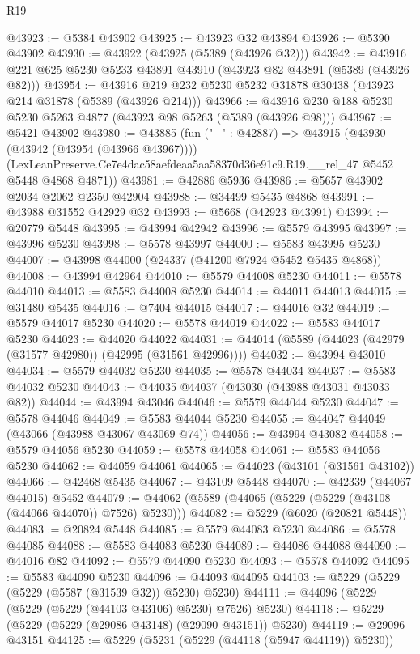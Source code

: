 \begin{lexlean}{R19}
\begin{coremodule}
@43923 := @5384 @43902
@43925 := @43923 @32 @43894
@43926 := @5390 @43902
@43930 := @43922 (@43925 (@5389 (@43926 @32)))
@43942 := @43916 @221 @625 @5230 @5233 @43891 @43910 (@43923 @82 @43891 (@5389 (@43926 @82)))
@43954 := @43916 @219 @232 @5230 @5232 @31878 @30438 (@43923 @214 @31878 (@5389 (@43926 @214)))
@43966 := @43916 @230 @188 @5230 @5230 @5263 @4877 (@43923 @98 @5263 (@5389 (@43926 @98)))
@43967 := @5421 @43902
@43980 := @43885
    (fun ("_" : @42887) =>
    @43915
      (@43930 (@43942 (@43954 (@43966 @43967))))
      (LexLeanPreserve.Ce7e4dac58aefdeaa5aa58370d36e91c9.R19.__rel_47 @5452 @5448 @4868 @4871))
@43981 := @42886 @5936
@43986 := @5657 @43902 @2034 @2062 @2350 @42904
@43988 := @34499 @5435 @4868
@43991 := @43988 @31552 @42929 @32
@43993 := @5668 (@42923 @43991)
@43994 := @20779 @5448
@43995 := @43994 @42942
@43996 := @5579 @43995
@43997 := @43996 @5230
@43998 := @5578 @43997
@44000 := @5583 @43995 @5230
@44007 := @43998 @44000 (@24337 (@41200 @7924 @5452 @5435 @4868))
@44008 := @43994 @42964
@44010 := @5579 @44008 @5230
@44011 := @5578 @44010
@44013 := @5583 @44008 @5230
@44014 := @44011 @44013
@44015 := @31480 @5435
@44016 := @7404 @44015
@44017 := @44016 @32
@44019 := @5579 @44017 @5230
@44020 := @5578 @44019
@44022 := @5583 @44017 @5230
@44023 := @44020 @44022
@44031 := @44014 (@5589 (@44023 (@42979 (@31577 @42980)) (@42995 (@31561 @42996))))
@44032 := @43994 @43010
@44034 := @5579 @44032 @5230
@44035 := @5578 @44034
@44037 := @5583 @44032 @5230
@44043 := @44035 @44037 (@43030 (@43988 @43031 @43033 @82))
@44044 := @43994 @43046
@44046 := @5579 @44044 @5230
@44047 := @5578 @44046
@44049 := @5583 @44044 @5230
@44055 := @44047 @44049 (@43066 (@43988 @43067 @43069 @74))
@44056 := @43994 @43082
@44058 := @5579 @44056 @5230
@44059 := @5578 @44058
@44061 := @5583 @44056 @5230
@44062 := @44059 @44061
@44065 := @44023 (@43101 (@31561 @43102))
@44066 := @42468 @5435
@44067 := @43109 @5448
@44070 := @42339 (@44067 @44015) @5452
@44079 := @44062 (@5589 (@44065 (@5229 (@5229 (@43108 (@44066 @44070)) @7526) @5230)))
@44082 := @5229 (@6020 (@20821 @5448))
@44083 := @20824 @5448
@44085 := @5579 @44083 @5230
@44086 := @5578 @44085
@44088 := @5583 @44083 @5230
@44089 := @44086 @44088
@44090 := @44016 @82
@44092 := @5579 @44090 @5230
@44093 := @5578 @44092
@44095 := @5583 @44090 @5230
@44096 := @44093 @44095
@44103 := @5229 (@5229 (@5229 (@5587 (@31539 @32)) @5230) @5230)
@44111 := @44096 (@5229 (@5229 (@5229 (@44103 @43106) @5230) @7526) @5230)
@44118 := @5229 (@5229 (@5229 (@29086 @43148) (@29090 @43151)) @5230)
@44119 := @29096 @43151
@44125 := @5229 (@5231 (@5229 (@44118 (@5947 @44119)) @5230))

\end{coremodule}
\end{lexlean}
